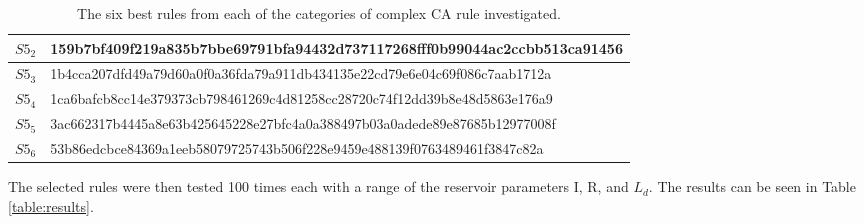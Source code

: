 \documentclass{elsarticle}
\begin{document}
\begin{multicols}{2}
\begin{table}[!htb]
\begin{tabular}{|p{2cm}|l|}
    \\
    \hline
    $S5_{2}$ & %
159b7bf409f219a835b7bbe69791bfa94432d737117268fff0b99044ac2ccbb513ca91456 \\
\hline
$S5_{3}$ & %
1b4cca207dfd49a79d60a0f0a36fda79a911db434135e22cd79e6e04c69f086c7aab1712a
\\ \hline
$S5_{4}$  & %
1ca6bafcb8cc14e379373cb798461269c4d81258cc28720c74f12dd39b8e48d5863e176a9
\\ \hline
$S5_{5}$ & %
3ac662317b4445a8e63b425645228e27bfc4a0a388497b03a0adede89e87685b12977008f
\\ \hline
$S5_{6}$ & %
53b86edcbce84369a1eeb58079725743b506f228e9459e488139f0763489461f3847c82a
\\ \hline
\end{tabular}
\caption{The six best rules from each of the categories of complex CA rule 
    investigated.}
\label{table:rules}
\end{table}


The selected rules were then tested 100 times each with a range of the 
reservoir parameters I, R, and $L_{d}$.  The results can be seen in Table 
\ref{table:results}. 


\end{multicols}
\end{document}
